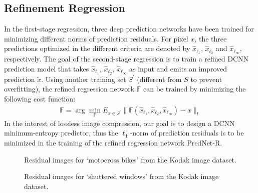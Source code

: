 \documentclass{article}
\def\w{4cm}
\def\h{3cm}
\begin{document}
\subsection{Refinement Regression}
In the first-stage regression, three deep prediction networks have been trained for minimizing different norms of prediction residuals.
For pixel $x$, the three predictions optimized in the different criteria are denoted by $\hat{x}_{\ell_1}$, $\hat{x}_{\ell_2}$ and $\hat{x}_{\ell_\infty}$, respectively.
The goal of the second-stage regression is to train a refined DCNN prediction model that takes $\hat{x}_{\ell_1}$, $\hat{x}_{\ell_2}$, $\hat{x}_{\ell_\infty}$ as input and emits an improved prediction $\tilde{x}$.
Using another training set $S^{'}$ (different from $S$ to prevent overfitting), the refined regression network $\mathbb{F}$ can be trained by minimizing the following cost function:
\begin{align}
	\mathbb{F} = \arg \min_\mathbb{F} E_{x\in S^{'}}
		\|
		\mathbb{F}(\hat{x}_{\ell_1}, \hat{x}_{\ell_2}, \hat{x}_{\ell_\infty})
		- x
		\|_l
\end{align}
In the interest of lossless image compression, our goal is to design a DCNN minimum-entropy predictor, thus the $\ell_1$-norm of prediction residuals is to be minimized in the training of the refined regression network PredNet-R.

\begin{figure*}[!h]
\centering
{}
\caption{Residual images for `motocross bikes' from the Kodak image dataset.}
\label{fig:bikes}
\end{figure*}
\begin{figure*}[!h]
\centering
{}
\caption{Residual images for `shuttered windows' from the Kodak image dataset.}
\label{fig:windows}
\end{figure*}
\end{document}
